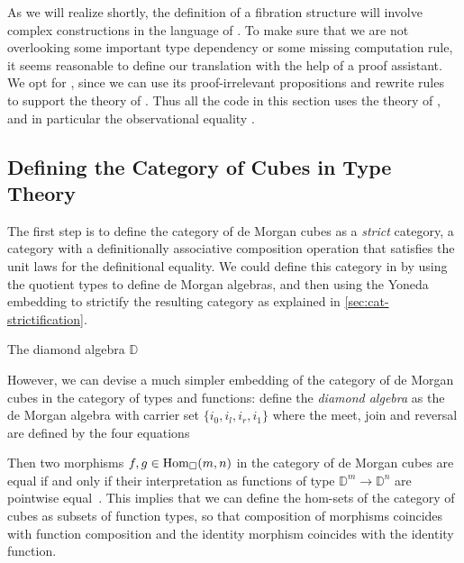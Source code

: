 As we will realize shortly, the definition of a fibration structure 
will involve complex constructions in the language of \SetoidCCplus.
% 
To make sure that we are not overlooking some important type dependency or some 
missing computation rule, it seems reasonable to define our translation with the help of a 
proof assistant.
% 
We opt for \Agda, since we can use its proof-irrelevant propositions and rewrite 
rules~ to support the theory of \SetoidCCplus.
% 
Thus all the \Agda code in this section uses the theory of \SetoidCC, and
in particular the observational equality \func{\_\textasciitilde{}\_}.


\subsection{Defining the Category of Cubes in Type Theory}

The first step is to define the category of de Morgan cubes as a \emph{strict}
category, \ie a category with a definitionally associative composition
operation that satisfies the unit laws for the definitional equality.
% 
We could define this category in \SetoidCCplus by using the quotient
types to define de Morgan algebras, and then using the Yoneda embedding to
strictify the resulting category as explained in \cref{sec:cat-strictification}.

\begin{marginfigure}
\caption{The diamond algebra \( \mathbb{D} \)}
\end{marginfigure}
% 
However, we can devise a much simpler embedding of the category of de Morgan
cubes in the category of types and functions:
% 
define the \emph{diamond algebra} as the de Morgan algebra with carrier set 
\( \{ i_0, i_l, i_r, i_1 \} \) where the meet, join and reversal are defined by 
the four equations
% 
Then two morphisms \( f, g \in \hom[\catCube]{m}{n} \) in the category of de 
Morgan cubes are equal if and only if their interpretation as functions of type 
\( \mathbb{D}^m \to \mathbb{D}^n \) are pointwise equal~.
% 
This implies that we can define the hom-sets of the category of cubes as 
subsets of function types, so that composition of morphisms coincides 
with function composition and the identity morphism coincides with the 
identity function.

